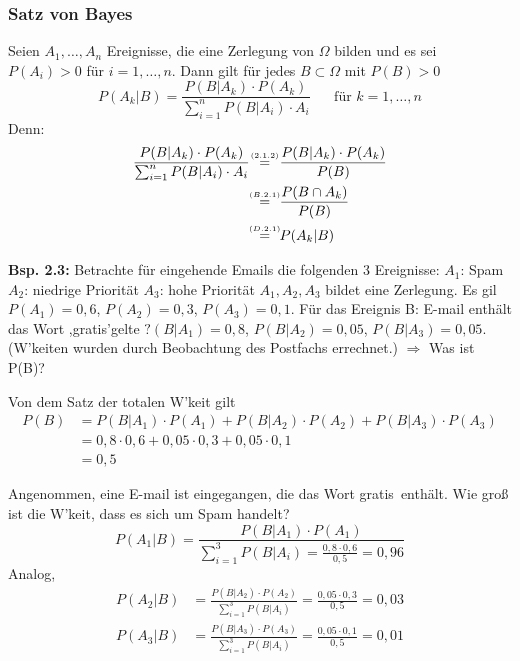 \documentclass[a4paper,11pt]{article}
\newcommand\stw{\overset{\mathclap{\scriptscriptstyle (2.1.2)}}{=}}
\newcommand\Btuwon{\overset{\mathclap{\scriptscriptstyle (B.2.1)}}{=}}
\newcommand\Dtuwon{\overset{\mathclap{\scriptscriptstyle (D.2.1)}}{=}}
\begin{document}
\subsubsection{Satz von Bayes}
\noindent Seien $A_1,\dots,A_n$ Ereignisse, die eine Zerlegung von $\Omega$ bilden und es sei $P(A_i)>0$ für $i=1,\dots,n$. Dann gilt für jedes $B\subset\Omega$ mit $P(B)>0$
\[P(A_k|B)=\frac{P(B|A_k)\cdot P(A_k)}{\sum_{i=1}^{n}P(B|A_i)\cdot A_i} \hspace{20pt} \text{für } k=1,\dots,n\]
Denn:
\begin{align*}
\frac{P(B|A_k)\cdot P(A_k)}{\sum_{i=1}^{n}P(B|A_i)\cdot A_i} & \hspace{4pt}\stw\hspace{4pt} \frac{P(B|A_k)\cdot P(A_k)}{P(B)}\\
& \hspace{4pt}\Btuwon\hspace{4pt} \frac{P(B\cap A_k)}{P(B)}\\
& \hspace{4pt}\Dtuwon\hspace{4pt} P(A_k|B)\\
\end{align*}

\vspace{6pt}
\noindent\textbf{Bsp. 2.3:} Betrachte für eingehende Emails die folgenden 3 Ereignisse:
\newline $A_1$: \glqq Spam\grqq
\newline $A_2$: \glqq niedrige Priorität\grqq
\newline $A_3$: \glqq hohe Priorität\grqq
\newline $A_1,A_2,A_3$ bildet eine Zerlegung. Es gil $P(A_1)=0,6$, $P(A_2)=0,3$, $P(A_3)=0,1$. 
\newline Für das Ereignis B: \glqq E-mail enthält das Wort ,gratis'\grqq gelte $?(B|A_1)=0,8$, $P(B|A_2)=0,05$, $P(B|A_3)=0,05$. (W'keiten wurden durch Beobachtung des Postfachs errechnet.)
\newline $\Rightarrow$ Was ist P(B)?

\vspace{4pt}
\noindent Von dem Satz der totalen W'keit gilt
\begin{align*}
P(B) &= P(B|A_1)\cdot P(A_1) + P(B|A_2)\cdot P(A_2) + P(B|A_3)\cdot P(A_3)\\
&= 0,8\cdot0,6+0,05\cdot0,3+0,05\cdot0,1\\
&= 0,5
\end{align*}

Angenommen, eine E-mail ist eingegangen, die das Wort \glqq gratis\grqq\ enthält. Wie groß ist die W'keit, dass es sich um Spam handelt?
\[P(A_1|B)=\frac{P(B|A_1)\cdot P(A_1)}{\sum_{i=1}^{3}P(B|A_i)=\frac{0,8\cdot0,6}{0,5}=0,96}\]
Analog,
\begin{align*}
    P(A_2|B)&=\frac{P(B|A_2)\cdot P(A_2)}{\sum_{i=1}^{3}P(B|A_i)}=\frac{0,05\cdot0,3}{0,5}=0,03\\
    P(A_3|B)&=\frac{P(B|A_3)\cdot P(A_3)}{\sum_{i=1}^{3}P(B|A_i)}=\frac{0,05\cdot0,1}{0,5}=0,01\\
\end{align*}
\end{document}
